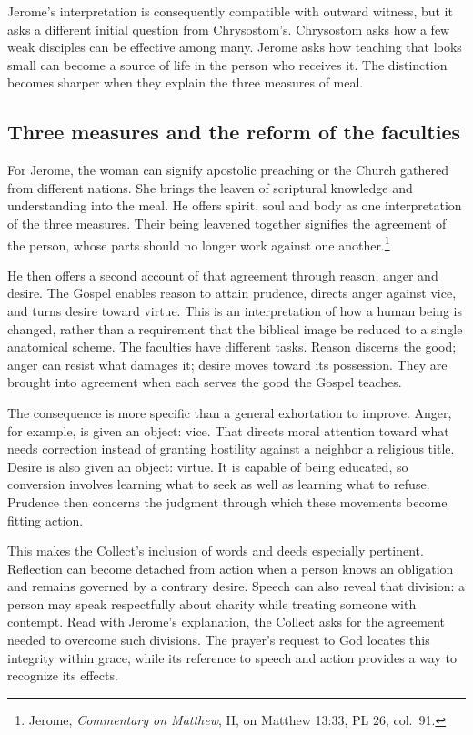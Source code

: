 Jerome's interpretation is consequently compatible with outward witness, but it asks a different initial question from Chrysostom's. Chrysostom asks how a few weak disciples can be effective among many. Jerome asks how teaching that looks small can become a source of life in the person who receives it. The distinction becomes sharper when they explain the three measures of meal.

\subsection{Three measures and the reform of the faculties}

For Jerome, the woman can signify apostolic preaching or the Church gathered from different nations. She brings the leaven of scriptural knowledge and understanding into the meal. He offers spirit, soul and body as one interpretation of the three measures. Their being leavened together signifies the agreement of the person, whose parts should no longer work against one another.\footnote{Jerome, \textit{Commentary on Matthew}, II, on Matthew 13:33, PL 26, col.~91.}

He then offers a second account of that agreement through reason, anger and desire. The Gospel enables reason to attain prudence, directs anger against vice, and turns desire toward virtue. This is an interpretation of how a human being is changed, rather than a requirement that the biblical image be reduced to a single anatomical scheme. The faculties have different tasks. Reason discerns the good; anger can resist what damages it; desire moves toward its possession. They are brought into agreement when each serves the good the Gospel teaches.

The consequence is more specific than a general exhortation to improve. Anger, for example, is given an object: vice. That directs moral attention toward what needs correction instead of granting hostility against a neighbor a religious title. Desire is also given an object: virtue. It is capable of being educated, so conversion involves learning what to seek as well as learning what to refuse. Prudence then concerns the judgment through which these movements become fitting action.

This makes the Collect's inclusion of words and deeds especially pertinent. Reflection can become detached from action when a person knows an obligation and remains governed by a contrary desire. Speech can also reveal that division: a person may speak respectfully about charity while treating someone with contempt. Read with Jerome's explanation, the Collect asks for the agreement needed to overcome such divisions. The prayer's request to God locates this integrity within grace, while its reference to speech and action provides a way to recognize its effects.

